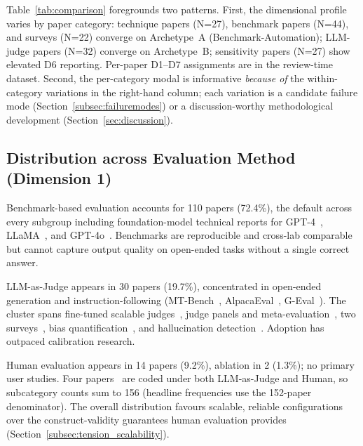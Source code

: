 \documentclass[acmsmall, nonacm, screen]{acmart}
\begin{document}
Table~\ref{tab:comparison} foregrounds two patterns. First, the
dimensional profile varies by paper category: technique papers
(N=27), benchmark papers (N=44), and surveys (N=22) converge on
Archetype~A (Benchmark-Automation); LLM-judge papers (N=32) converge
on Archetype~B; sensitivity papers (N=27) show elevated D6 reporting.
Per-paper D1--D7 assignments are in the review-time dataset.
Second, the per-category modal is informative \emph{because of} the
within-category variations in the right-hand column; each variation
is a candidate failure mode (Section~\ref{subsec:failuremodes}) or a
discussion-worthy methodological development (Section~\ref{sec:discussion}).



\subsection{Distribution across Evaluation Method (Dimension 1)}
\label{subsec:d1dist}

Benchmark-based evaluation accounts for 110 papers (72.4\%), the
default across every subgroup including foundation-model technical
reports for GPT-4~\cite{achiam2023gpt4},
LLaMA~\cite{touvron2023llama, touvron2023llama2}, and
GPT-4o~\cite{hurst2024gpt4o}. Benchmarks are reproducible and
cross-lab comparable but cannot capture output quality on open-ended
tasks without a single correct answer.

LLM-as-Judge appears in 30 papers (19.7\%), concentrated in
open-ended generation and instruction-following
(MT-Bench~\cite{zheng2023judging},
AlpacaEval~\cite{dubois2024alpacaeval}, G-Eval~\cite{liu2023geval}).
The cluster spans fine-tuned scalable judges~\cite{zhu2023judgelm},
judge panels and meta-evaluation~\cite{verga2024replacing,
chern2024scaleeval, multiagentjudge2025}, two
surveys~\cite{gu2025llmjudge, li2024llmsjudges}, bias
quantification~\cite{ye2024justice, wataoka2024selfpreference,
judgingjudges2024, judgebench2024}, and hallucination
detection~\cite{akbar2024hallumeasure}. Adoption has outpaced
calibration research.

Human evaluation appears in 14 papers (9.2\%), ablation in 2 (1.3\%);
no primary user studies. Four papers~\cite{llmvshuman2024,
alternativeannotator2025, humansorllm2024, canlllmsreplace2023} are
coded under both LLM-as-Judge and Human, so subcategory counts sum
to 156 (headline frequencies use the 152-paper denominator). The
overall distribution favours scalable, reliable configurations over
the construct-validity guarantees human evaluation provides
(Section~\ref{subsec:tension_scalability}).
\end{document}
